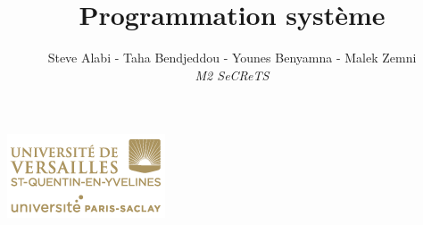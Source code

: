 
\usepackage[right=2.3cm, left=2.3cm, bottom=3cm, top=2.2cm, footskip=1.5cm,]{geometry}

\title{\vspace{15em}\textbf{\Huge Programmation système}}
\author{
	Steve Alabi - Taha Bendjeddou - Younes Benyamna - Malek Zemni
	\vspace{2em}\\
	\textit{M2 SeCReTS}
	\vspace{2em}
}


\clearpage
\maketitle\vspace{15em}
\begin{center}\includegraphics[scale=0.7]{../img/logo.png}\end{center}

\newpage
\tableofcontents

\newpage\clearpage{}

	
		
	
	
	
	
	
	
	

